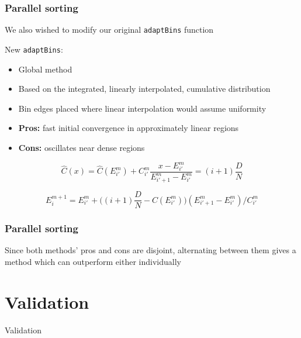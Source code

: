 \documentclass{beamer}
\begin{document}
\begin{frame}
	\frametitle{Parallel sorting}
	
	We also wished to modify our original \texttt{adaptBins} function
	
	
	\begin{block}{New \texttt{adaptBins}:}
		\begin{itemize}
			\item Global method
			\item Based on the integrated, linearly interpolated, cumulative distribution
			\item Bin edges placed where linear interpolation would assume uniformity
			\item \textbf{Pros:} fast initial convergence in approximately linear regions
			\item \textbf{Cons:} oscillates near dense regions
		\end{itemize}
	\end{block}
	
	\vspace{-5pt}
	
	\begin{equation}
		\hat C(x) = \hat C(E^m_{i'}) + C^m_{i'} \dfrac{x - E^m_{i'}}{E^m_{{i'}+1} - E^m_{i'}} = (i+1) \dfrac{D}{N}
	\end{equation}
	
	\begin{equation}
		E^{m+1}_i = E^m_{i'} + \Big( (i+1) \dfrac{D}{N} - C(E^m_{i'}) \Big) (E^m_{{i'}+1} - E^m_{i'}) / C^m_{i'}
	\end{equation}
	
\end{frame}

\begin{frame}
	\frametitle{Parallel sorting}
	
	Since both methods' pros and cons are disjoint, alternating between them gives a method which can outperform either individually
	
\end{frame}




\section{Validation}

\begin{frame}	
	\begin{Huge}
		\begin{center}
			Validation
		\end{center}
	\end{Huge}
\end{frame}
\end{document}
